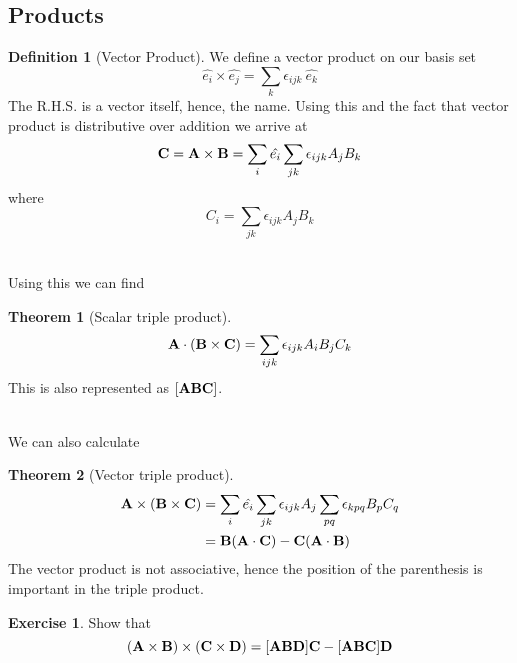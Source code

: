 \documentclass[10pt, a4paper]{extarticle}
\theoremstyle{definition}
\newtheorem{thm}{Theorem}
\newtheorem{defn}{Definition}
\newtheorem{ex}{Exercise}
\begin{document}
\subsection{Products}
\begin{framed}
	\begin{defn}[Vector Product]
		We define a vector product on our basis set
		\[\hat{e_i}\times\hat{e_j}=\sum_k \epsilon_{ijk}\ \hat{e_k}\]
		The R.H.S. is a vector itself, hence, the name. Using this and the fact that vector product is distributive over addition we arrive at
		\[\vb{C}=\vb{A}\times\vb{B}=\sum_i \hat{e_i}\sum_{jk}\epsilon_{ijk}A_jB_k\]
		where \[C_i=\sum_{jk}\epsilon_{ijk}A_jB_k\]
	\end{defn}
\end{framed}
\hfill\\
Using this we can find
\begin{framed}
	\begin{thm}[Scalar triple product]
		\[\vb{A}\cdot(\vb{B}\times\vb{C})=\sum_{ijk}\epsilon_{ijk}A_iB_jC_k\]
		This is also represented as $[\vb{ABC}]$.
	\end{thm}
\end{framed}
\hfill\\
We can also calculate
\begin{framed}
	\begin{thm}[Vector triple product]
		\begin{align*}
			\vb{A}\times(\vb{B}\times\vb{C}) & =\sum_i \hat{e_i}\sum_{jk}\epsilon_{ijk}A_j\sum_{pq}\epsilon_{kpq}B_pC_q \\
			                                 & =\vb{B}(\vb{A}\cdot\vb{C})-\vb{C}(\vb{A}\cdot\vb{B})
		\end{align*}
		The vector product is not associative, hence the position of the parenthesis is important in the triple product.
	\end{thm}
\end{framed}

\begin{ex}
	Show that
	\[(\vb{A}\times\vb{B})\times(\vb{C}\times\vb{D})=[\vb{ABD}]\vb{C}-[\vb{ABC}]\vb{D}\]
\end{ex}
\end{document}
